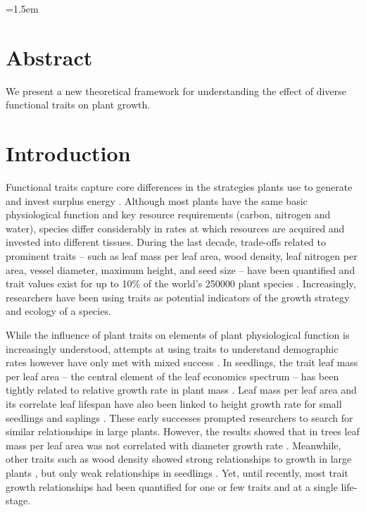 \documentclass[a4paper,11pt]{article}
\date{}
\begin{document}
\mstitlepage
\noindent
\parindent=1.5em
\addtolength{\parskip}{.3em}

\tableofcontents

\section{Abstract}
We present a new theoretical framework for understanding the effect of diverse functional traits on plant growth.

\section{Introduction}

Functional traits capture core differences in the strategies plants use to generate and invest surplus energy \citep{Wright-2004, Chave-2009, Westoby-2002}. Although most plants have the same basic physiological function and key resource requirements (carbon, nitrogen and water), species differ considerably in rates at which resources are acquired and invested into different tissues. During the last decade, trade-offs related to prominent traits -- such as leaf mass per leaf area, wood density, leaf nitrogen per area, vessel diameter, maximum  height, and seed size -- have been quantified and trait values exist for up to 10\% of the world's 250000 plant species \citep{Cornwell-2014}. Increasingly, researchers have been using traits as potential indicators of the growth strategy and ecology of a species.

While the influence of plant traits on elements of plant physiological function is increasingly understood, attempts at using traits to understand demographic rates however have only met with mixed success \citep{Wright-2010, Poorter-2008}. In seedlings, the trait leaf mass per leaf area -- the central element of the leaf economics spectrum \citep{Wright-2004} -- has been tightly related to relative growth rate in plant mass \citep{Lambers-1992, Wright-2000}. Leaf mass per leaf area and its correlate leaf lifespan have also been linked to height growth rate for small seedlings and saplings \citep{Reich-1992, Poorter-2006}. These early successes prompted researchers to search for similar relationships in large plants. However, the results showed that in trees leaf mass per leaf area was not correlated with diameter growth rate \citep{Poorter-2008, Wright-2010, Herault-2011}. Meanwhile, other traits such as wood density showed strong relationships to growth in large plants \citep{Wright-2010}, but only weak relationships in seedlings \citep{Castro-1998}. Yet, until recently, most trait growth relationships had been quantified for one or few traits and at a single life- stage.
\end{document}
